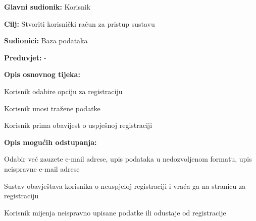 					\noindent {}
					\begin{packed_item}
						
						\item \textbf{Glavni sudionik: }Korisnik
						\item  \textbf{Cilj:} Stvoriti korisnički račun za pristup sustavu
						\item  \textbf{Sudionici:} Baza podataka
						\item  \textbf{Preduvjet:} -
						\item  \textbf{Opis osnovnog tijeka:}
						
						\item[] \begin{packed_enum}
							
							\item Korisnik odabire opciju za registraciju
							\item Korisnik unosi tražene podatke
							\item Korisnik prima obavijest o uspješnoj registraciji
						\end{packed_enum}
						
						\item  \textbf{Opis mogućih odstupanja:}
						
						\item[] \begin{packed_item}
							
							\item[2.a] Odabir već zauzete e-mail adrese, upis podataka u nedozvoljenom formatu, upis neispravne e-mail adrese 
							\item[] \begin{packed_enum}
								
								\item Sustav obavještava korisnika o neuspjeloj registraciji i vraća ga na stranicu za registraciju
								\item Korisnik mijenja neispravno upisane podatke ili odustaje od registracije
								
							\end{packed_enum}
							
						\end{packed_item}
					\end{packed_item}
					
